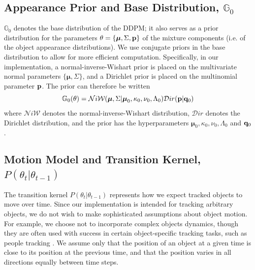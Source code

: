 \documentclass[twocolumn, final]{svjour3}
\begin{document}
\subsection{Appearance Prior and Base Distribution, $\mathbb{G}_{0}$}
\label{sec:appearanceprior}

$\mathbb{G}_{0}$ denotes the base distribution of the DDPM; it also serves as a prior distribution for the parameters $\theta = \{ \boldsymbol{\mu}, \Sigma, \bold{p} \}$ of the mixture components (i.e. of the object appearance distributions). We use conjugate priors in the base distribution to allow for more efficient computation. Specifically, in our implementation, a normal-inverse-Wishart prior is placed on the multivariate normal parameters $\{ \boldsymbol{\mu}, \Sigma \}$, and a Dirichlet prior is placed on the multinomial parameter $\bold{p}$. The prior can therefore be written
\begin{equation}
\label{basedistro}
\mathbb{G}_{0}(\theta) = \mathcal{N}i\mathcal{W}(\boldsymbol{\mu}, \Sigma | \boldsymbol{\mu}_{0}, \kappa_{0}, \nu_{0}, \Lambda_{0})  \mathcal{D}ir( \bold{p} | \bold{q}_{0})
\end{equation}
where $\mathcal{N}i\mathcal{W}$ denotes the normal-inverse-Wishart distribution, $\mathcal{D}ir$ denotes the Dirichlet distribution, and the prior has the hyperparameters $\boldsymbol{\mu}_{0}, \kappa_{0}, \nu_{0}, \Lambda_{0}$ and $\bold{q}_{0}$.


\subsection{Motion Model and Transition Kernel, $P(\theta_{t} | \theta_{t-1})$}
\label{sec:motionmodel}

The transition kernel $P(\theta_{t} | \theta_{t-1})$ represents how we expect tracked objects to move over time. Since our implementation is intended for tracking arbitrary objects, we do not wish to make sophisticated assumptions about object motion. For example, we choose not to incorporate complex objects dynamics, though they are often used with success in certain object-specific tracking tasks, such as people tracking \cite{choo2001people, conte2010performance}. We assume only that the position of an object at a given time is close to its position at the previous time, and that the position varies in all directions equally between time steps.
\end{document}
